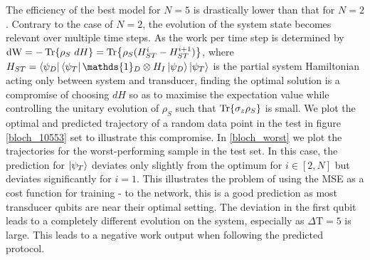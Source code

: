 The efficiency of the best model for $N=5$ is drastically lower than that for $N=2$.
Contrary to the case of $N=2$, the evolution of the system state becomes relevant over multiple time steps.
As the work per time step is determined by $\mathrm{dW} = -\Tr{\rho_S \ dH} = \Tr{\rho_S (H_{ST}^i - H_{ST}^{i+1})}$, where $H_{ST} = \bra{\psi_D}\bra{\psi_T} \mathds{1}_D \otimes H_I \ket{\psi_D} \ket{\psi_T}$ is the partial system Hamiltonian acting only between system and transducer, finding the optimal solution is a compromise of choosing $dH$ so as to maximise the expectation value while controlling the unitary evolution of $\rho_S$ such that $\Tr{\sigma_z \rho_S}$ is small.
We plot the optimal and predicted trajectory of a random data point in the test in figure \ref{bloch_10553} set to illustrate this compromise.
In \ref{bloch_worst} we plot the trajectories for the worst-performing sample in the test set.
In this case, the prediction for $\ket{\psi_T}$ deviates only slightly from the optimum for $i \in [2, N]$ but deviates significantly for $i=1$.
This illustrates the problem of using the MSE as a cost function for training - to the network, this is a good prediction as most transducer qubits are near their optimal setting.
The deviation in the first qubit leads to a completely different evolution on the system, especially as $\Delta \mathrm{T} = 5$ is large.
This leads to a negative work output when following the predicted protocol.


